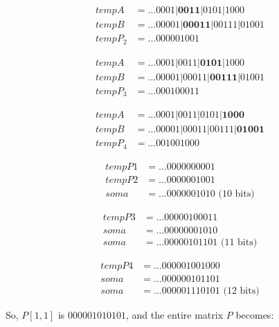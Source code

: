 \documentclass[10pt]{article}
\begin{document}
\begin{align*}
 tempA&= \ldots0001|\textbf{0011}|0101|1000\\
 tempB&= \ldots00001|\textbf{00011}|00111|01001\\
 tempP_2&= \ldots000001001
\end{align*}

\begin{align*}
 tempA&= \ldots0001|0011|\textbf{0101}|1000\\
 tempB&= \ldots00001|00011|\textbf{00111}|01001\\
 tempP_3&= \ldots000100011
\end{align*}

\begin{align*}
 tempA&= \ldots0001|0011|0101|\textbf{1000}\\
 tempB&= \ldots00001|00011|00111|\textbf{01001}\\
 tempP_4&= \ldots001001000
\end{align*}

\begin{align*}
 tempP1&= \ldots0000000001 \\
 tempP2&= \ldots0000001001 \\
   soma&= \ldots0000001010 \text{ (10 bits)}
\end{align*}

\begin{align*}
 tempP3&= \ldots00000100011 \\
   soma&= \ldots00000001010 \\
   soma&= \ldots00000101101 \text{ (11 bits)}
\end{align*}

\begin{align*}
 tempP4&= \ldots000001001000 \\
 soma&=   \ldots000000101101 \\
 soma&=   \ldots000001110101 \text{ (12 bits)}
\end{align*}

So, $P[1,1]$ is $000001010101$, and the entire matrix $P$ becomes:
\end{document}
